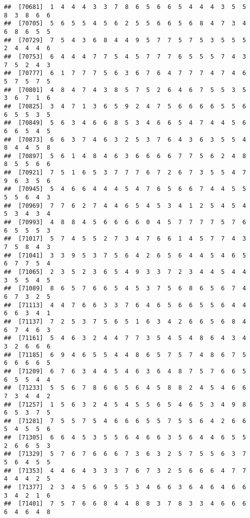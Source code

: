\documentclass[
]{book}
\begin{document}
\begin{verbatim}
##  [70681]  1  4  4  4  3  3  7  8  6  5  6  6  5  4  4  4  3  5  5  8  3  8  6  6
##  [70705]  5  6  5  5  4  5  6  2  5  5  6  6  5  6  8  4  7  3  4  6  8  6  5  5
##  [70729]  7  5  4  3  6  8  4  4  9  5  7  7  5  7  5  3  5  5  5  2  4  4  4  6
##  [70753]  6  4  4  4  7  7  5  4  5  7  7  7  6  5  5  5  7  4  3  7  5  2  4  3
##  [70777]  6  1  7  7  7  5  6  3  6  7  6  4  7  7  7  4  7  4  6  5  7  5  7  5
##  [70801]  4  8  4  7  4  3  8  5  7  5  2  6  4  6  7  5  5  3  5  3  6  7  1  6
##  [70825]  3  4  7  1  3  6  5  9  2  4  7  5  6  6  6  6  5  5  6  6  5  5  3  5
##  [70849]  5  6  3  4  6  6  8  5  3  4  6  6  5  4  7  4  4  5  6  6  6  5  4  5
##  [70873]  6  6  3  7  4  6  3  2  5  3  7  6  4  3  6  3  5  5  4  8  4  4  5  8
##  [70897]  5  6  1  4  8  4  6  3  6  6  6  6  7  7  5  6  2  4  8  8  5  5  6  6
##  [70921]  7  5  1  6  5  3  7  7  7  6  7  2  6  7  3  5  5  4  7  9  6  3  5  6
##  [70945]  5  4  6  6  4  4  4  5  4  7  6  5  6  6  7  4  4  5  5  5  5  6  4  3
##  [70969]  7  7  6  2  7  4  4  6  5  4  5  3  4  1  2  5  4  5  4  5  3  4  3  4
##  [70993]  4  8  8  4  5  6  6  6  6  0  4  5  7  7  7  7  5  7  6  6  5  5  5  3
##  [71017]  5  7  4  5  5  2  7  3  4  7  6  6  1  4  5  7  7  4  3  7  5  8  4  3
##  [71041]  3  3  9  5  3  7  5  6  4  2  6  5  6  4  4  5  4  6  5  6  7  7  5  4
##  [71065]  2  3  5  2  3  6  5  4  9  3  3  7  2  3  4  4  5  4  4  3  5  5  4  5
##  [71089]  8  6  5  7  6  6  5  4  5  3  7  5  6  8  6  5  6  7  4  6  7  3  2  5
##  [71113]  4  4  7  6  6  3  3  7  6  4  6  5  6  6  5  5  6  4  4  6  6  3  4  1
##  [71137]  7  2  5  3  7  5  6  5  1  6  3  4  2  6  6  5  6  8  4  6  7  4  6  3
##  [71161]  5  4  6  3  2  4  4  7  7  3  5  4  5  4  8  6  4  3  4  3  2  6  6  6
##  [71185]  6  9  4  6  5  5  4  4  8  6  5  7  5  7  4  8  6  7  5  6  6  6  6  5
##  [71209]  6  7  6  3  4  4  5  4  6  3  6  4  8  7  5  7  6  6  5  6  5  5  4  4
##  [71233]  5  5  6  7  8  6  6  5  6  4  5  8  8  2  4  5  4  6  6  7  3  4  4  2
##  [71257]  1  5  6  3  2  4  5  4  5  5  6  5  4  6  5  3  4  9  8  6  5  3  7  5
##  [71281]  7  5  5  7  5  4  6  6  6  5  5  7  5  5  6  4  2  6  6  5  4  5  5  6
##  [71305]  6  6  4  5  3  5  5  6  4  6  6  3  5  6  4  4  6  5  5  2  6  6  5  3
##  [71329]  5  7  6  7  6  6  6  7  3  6  3  2  5  7  5  5  6  3  7  5  6  4  5  5
##  [71353]  4  4  6  4  3  3  3  7  6  7  3  2  5  6  6  6  4  7  7  4  4  4  2  5
##  [71377]  2  3  4  5  6  9  5  5  3  4  6  6  3  6  4  6  4  6  6  3  4  2  1  6
##  [71401]  7  5  7  6  6  8  4  4  8  8  3  7  8  3  3  4  6  6  6  6  4  6  4  8

\end{verbatim}
\end{document}
